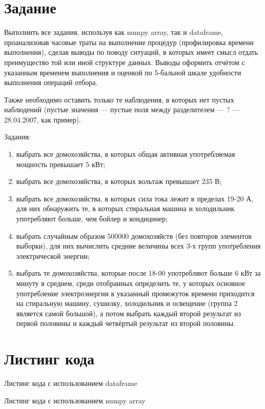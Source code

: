 \chapter{Задание}
Выполнить все задания, используя как numpy array, так и dataframe, проанализовав часовые траты на выполнение процедур (профилировка времени выполнения), сделав выводы по поводу ситуаций, в которых имеет смысл отдать преимущество той или иной структуре данных. Выводы оформить отчётом с указанным временем выполнения и оценкой по 5-бальной шкале удобности выполнения операций отбора.


Также необходимо оставить только те наблюдения, в которых нет пустых наблюдений (пустые значения --- пустые поля между разделителем --- ? --- 28.04.2007, как пример).

Задания:
\begin{enumerate}
\item выбрать все домохозяйства, в которых общая активная употребляемая мощность превышает 5 кВт;
\item выбрать все домохозяйства, в которых вольтаж превышает 235 В;
\item выбрать все домохозяйства, в которых сила тока лежит в пределах 19-20 А, для них обнаружить те, в которых стиральная машина и холодильник употребляют больше, чем бойлер и кондицинер;
\item выбрать случайным образом 500000 домохозяйств (без повторов элементов выборки), для них вычислить средние величины всех 3-х групп употребления электрической энергии;
\item выбрать те домохозяйства, которые после 18-00 употребляют больше 6 кВт за минуту в среднем, среди отобранных определить те, у которых основное употребление электроэнергии в указанный промежуток времени приходится на стиральную машину, сушилку, холодильник и освещение (группа 2 является самой большой), а потом выбрать каждый второй результат из первой половины и каждый четвёртый результат из второй половины.
\end{enumerate}

\chapter{Листинг кода}
Листинг кода с использованием dataframe
\lstset{inputencoding=utf8, extendedchars=\true}


Листинг кода с использованием numpy array
\lstset{inputencoding=utf8, extendedchars=\true}


